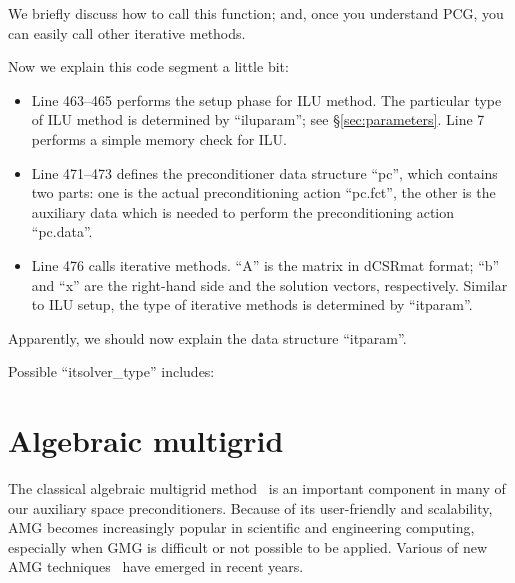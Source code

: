\documentclass[11pt]{memoir}
\begin{document}
We briefly discuss how to call this function; and, once you understand PCG, you can easily call other iterative methods.
%

%
Now we explain this code segment a little bit:
\begin{itemize}
\item Line 463--465 performs the setup phase for ILU method. The particular type of ILU method is determined by ``iluparam''; see \S\ref{sec:parameters}. Line 7 performs a simple memory check for ILU.
\item Line 471--473 defines the preconditioner data structure ``pc'', which contains two parts: one is the actual preconditioning action ``pc.fct'', the other is the auxiliary data which is needed to perform the preconditioning action ``pc.data''.
\item Line 476 calls iterative methods. ``A'' is the matrix in dCSRmat format; ``b'' and ``x'' are the right-hand side and the solution vectors, respectively. Similar to ILU setup, the type of iterative methods is determined by ``itparam''.
\end{itemize}

Apparently, we should now explain the data structure ``itparam''.
%

%
Possible ``itsolver\_type'' includes:
%

%

\section{Algebraic multigrid}\label{sec:amg}

The classical algebraic multigrid method~\cite{Ruge.RugeStuben.1987bs} is an important component in many of our auxiliary space preconditioners. Because of its user-friendly and scalability, AMG becomes increasingly popular in scientific and engineering computing, especially when GMG is difficult or not possible to be applied. Various of new AMG techniques~\cite{Vanek.VanekMandel.1996kl,Wan.WanChan.2000qa,Brezina.BrezinaCleary.2000ly,Henson.HensonVassilevski.2001cr,Chartier.ChartierFalgout.2003ve,Livne.Livne.2004kl,Falgout.FalgoutVassilevski.2004bh,Xu.XuZikatanov.2004pi,Brannick.BrannickZikatanov.2007zr,Muresan.MuresanNotay.2008tg, Hu.X;Vassilevski.P;Xu.J.2013a} have emerged in recent years.
\end{document}
